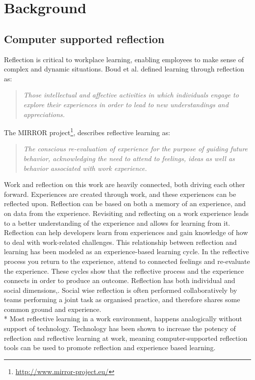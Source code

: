 \chapter{Background}
\label{chap:background}
\section{Computer supported reflection}
Reflection is critical to workplace learning, enabling employees to make sense of complex and dynamic situations\cite{Schon1983}. Boud et al.\cite{boudreflection1985} defined learning through reflection as: 
\begin{quote}
\emph{Those intellectual and affective activities in which individuals engage to explore their experiences in order to lead to new understandings and appreciations.}
\end{quote}
The MIRROR project\footnote{\url{http://www.mirror-project.eu/}}, describes reflective learning as:
\begin{quote}
\emph{The conscious re-evaluation of experience for the purpose of guiding future behavior, acknowledging the need to attend to feelings, ideas as well as behavior associated with work experience.}\cite{krogstiemodel}
\end{quote}

Work and reflection on this work are heavily connected\cite{Schon1983}, both driving each other forward. Experiences are created through work, and these experiences can be reflected upon. Reflection can be based on both a memory of an experience, and on data from the experience. Revisiting and reflecting on a work experience leads to a better understanding of the experience and allows for learning from it. Reflection can help developers learn from experiences and gain knowledge of how to deal with work-related challenges. This relationship between reflection and learning has been modeled as an experience-based learning cycle\cite{boudreflection1985,Korthagen_Vasalos_2005, KolbModel}. In the reflective process you return to the experience, attend to connected feelings and re-evaluate
the experience. These cycles show that the reflective process and the experience connects in order to produce an outcome.
Reflection has both individual and social dimensions,\cite{Høyrup_2004,Woerkom_Croon_2008}. Social wise reflection is often performed collaboratively by teams performing a joint task as organised practice, and therefore shares some common ground and experience. \\*
Most reflective learning in a work environment, happens analogically without support of technology\cite{Schindler_Eppler_2003}. Technology has been shown to increase the potency of reflection and reflective learning at work, meaning computer-supported reflection tools can be used to promote reflection and experience based learning\cite{krogstiereflectionwork, Lin_Hmelo_Kinzer_Secules_1999,Xiao_Clark_Rosson_Carroll_2008}. 

